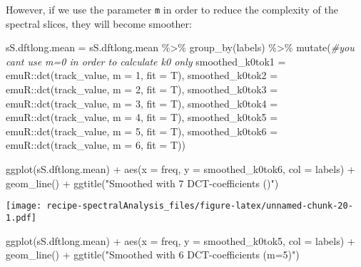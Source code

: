 \documentclass[
]{book}
\newenvironment{Shaded}{\begin{snugshade}}{\end{snugshade}}
\newcommand{\AttributeTok}[1]{\textcolor[rgb]{0.77,0.63,0.00}{#1}}
\newcommand{\CommentTok}[1]{\textcolor[rgb]{0.56,0.35,0.01}{\textit{#1}}}
\newcommand{\DecValTok}[1]{\textcolor[rgb]{0.00,0.00,0.81}{#1}}
\newcommand{\FunctionTok}[1]{\textcolor[rgb]{0.00,0.00,0.00}{#1}}
\newcommand{\NormalTok}[1]{#1}
\newcommand{\OtherTok}[1]{\textcolor[rgb]{0.56,0.35,0.01}{#1}}
\newcommand{\SpecialCharTok}[1]{\textcolor[rgb]{0.00,0.00,0.00}{#1}}
\newcommand{\StringTok}[1]{\textcolor[rgb]{0.31,0.60,0.02}{#1}}
\begin{document}
However, if we use the parameter \texttt{m} in order to reduce the complexity of the spectral slices, they will become smoother:

\begin{Shaded}
\begin{Highlighting}[]
\NormalTok{sS.dftlong.mean }\OtherTok{=}\NormalTok{ sS.dftlong.mean }\SpecialCharTok{\%\textgreater{}\%}
  \FunctionTok{group\_by}\NormalTok{(labels) }\SpecialCharTok{\%\textgreater{}\%}
  \FunctionTok{mutate}\NormalTok{(}\CommentTok{\#you can\textquotesingle{}t use m=0 in order to calculate k0 only}
    \AttributeTok{smoothed\_k0tok1 =}\NormalTok{ emuR}\SpecialCharTok{::}\FunctionTok{dct}\NormalTok{(track\_value, }\AttributeTok{m =} \DecValTok{1}\NormalTok{, }\AttributeTok{fit =}\NormalTok{ T),}
    \AttributeTok{smoothed\_k0tok2 =}\NormalTok{ emuR}\SpecialCharTok{::}\FunctionTok{dct}\NormalTok{(track\_value, }\AttributeTok{m =} \DecValTok{2}\NormalTok{, }\AttributeTok{fit =}\NormalTok{ T),}
    \AttributeTok{smoothed\_k0tok3 =}\NormalTok{ emuR}\SpecialCharTok{::}\FunctionTok{dct}\NormalTok{(track\_value, }\AttributeTok{m =} \DecValTok{3}\NormalTok{, }\AttributeTok{fit =}\NormalTok{ T),}
    \AttributeTok{smoothed\_k0tok4 =}\NormalTok{ emuR}\SpecialCharTok{::}\FunctionTok{dct}\NormalTok{(track\_value, }\AttributeTok{m =} \DecValTok{4}\NormalTok{, }\AttributeTok{fit =}\NormalTok{ T),}
    \AttributeTok{smoothed\_k0tok5 =}\NormalTok{ emuR}\SpecialCharTok{::}\FunctionTok{dct}\NormalTok{(track\_value, }\AttributeTok{m =} \DecValTok{5}\NormalTok{, }\AttributeTok{fit =}\NormalTok{ T),}
    \AttributeTok{smoothed\_k0tok6 =}\NormalTok{ emuR}\SpecialCharTok{::}\FunctionTok{dct}\NormalTok{(track\_value, }\AttributeTok{m =} \DecValTok{6}\NormalTok{, }\AttributeTok{fit =}\NormalTok{ T))}

\FunctionTok{ggplot}\NormalTok{(sS.dftlong.mean) }\SpecialCharTok{+}
  \FunctionTok{aes}\NormalTok{(}\AttributeTok{x =}\NormalTok{ freq, }\AttributeTok{y =}\NormalTok{ smoothed\_k0tok6, }\AttributeTok{col =}\NormalTok{ labels) }\SpecialCharTok{+}
  \FunctionTok{geom\_line}\NormalTok{() }\SpecialCharTok{+}
  \FunctionTok{ggtitle}\NormalTok{(}\StringTok{"Smoothed with 7 DCT{-}coefficients ()"}\NormalTok{)}
\end{Highlighting}
\end{Shaded}

\texttt{[image: recipe-spectralAnalysis\_files/figure-latex/unnamed-chunk-20-1.pdf]}

\begin{Shaded}
\begin{Highlighting}[]
\FunctionTok{ggplot}\NormalTok{(sS.dftlong.mean) }\SpecialCharTok{+}
  \FunctionTok{aes}\NormalTok{(}\AttributeTok{x =}\NormalTok{ freq, }\AttributeTok{y =}\NormalTok{ smoothed\_k0tok5, }\AttributeTok{col =}\NormalTok{ labels) }\SpecialCharTok{+}
  \FunctionTok{geom\_line}\NormalTok{() }\SpecialCharTok{+}
  \FunctionTok{ggtitle}\NormalTok{(}\StringTok{"Smoothed with 6 DCT{-}coefficients (m=5)"}\NormalTok{)}
\end{Highlighting}
\end{Shaded}
\end{document}
